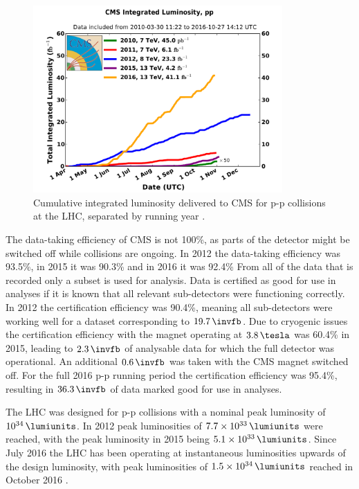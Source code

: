 \begin{figure}[h!]
\includegraphics[width=0.85\textwidth]{./Detector/Plots/int_lumi_cumulative_pp_2.pdf}
\caption[Cumulative integrated luminosity delivered to CMS
for p-p collisions at the LHC, separated by running year.]{Cumulative integrated luminosity delivered to \ac{CMS} for p-p collisions at the \ac{LHC}, separated
by running year \cite{cms-lumi-public}.}
\label{fig:CMSLHC_intlumi}
\end{figure}

The data-taking efficiency of CMS is not 100\%, as parts of the detector might be
switched off while collisions are ongoing. In 2012 the data-taking 
efficiency was 93.5\%, in 2015 it was 90.3\% and in 2016 it was 92.4\%
From all of the data that is recorded only a subset is used for analysis. Data is 
certified as good for use in analyses if it is known that all relevant sub-detectors
were functioning correctly. In 2012 the certification efficiency was 90.4\%, 
meaning all sub-detectors were working well for a dataset corresponding to $19.7\,\invfb$. %
Due to cryogenic issues the certification efficiency with the magnet operating
at $3.8\,\tesla$ was 60.4\% in 2015, leading to $2.3\,\invfb$ of 
analysable data for which the full detector was operational. An additional $0.6\,\invfb$
was taken with the \ac{CMS} magnet switched off. For the full 2016 p-p running period
the certification efficiency was 95.4\%, resulting in $36.3\,\invfb$ of data marked good %
for use in analyses.

The \ac{LHC} was designed for p-p collisions with a nominal
peak luminosity of $10^{34}\,\lumiunits$. In 2012 peak
luminosities of $7.7\times 10^{33}\,\lumiunits$ were reached, with the peak luminosity in
2015 being $5.1\times 10^{33}\,\lumiunits$. Since July 2016
the \ac{LHC} has been operating at instantaneous luminosities upwards of the 
design luminosity, with peak luminosities of $1.5\times10^{34}\,\lumiunits$ reached
in October 2016 \cite{cms-lumi-public}.

